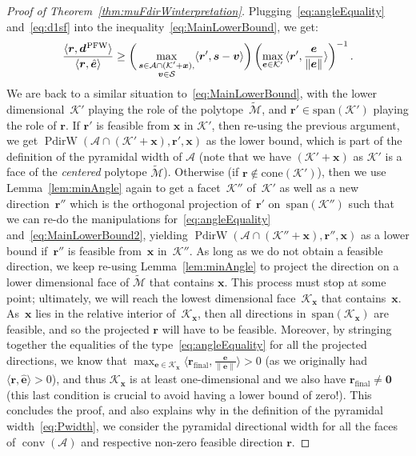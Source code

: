 \documentclass{article} %
\DeclareMathOperator*{\conv}{conv}
\newcommand{\domain}{\mathcal{M}} %
\newcommand{\PFW}{{\hspace{0.05em}\textnormal{PFW}}}
\newcommand{\x}{\bm{x}}
\newcommand{\s}{\bm{s}}
\newcommand{\dd}{\bm{d}}
\newcommand{\vv}{\bm{v}} %
\newcommand{\Vertices}{\mathcal{A}} %
\renewcommand{\S}{\mathcal{S}}
\renewcommand{\r}{\bm{r}}
\newcommand{\PdirW}{\mathop{PdirW}}
\newcommand{\innerProdCompressed}[2]{\langle #1 , #2 \rangle}
\newcommand{\Kface}{\mathcal{K}}
\newcommand{\err}{\bm{e}} %
\newcommand{\0}{\mathbf{0}} %
\begin{document}
\begin{proof}[Proof of Theorem~\ref{thm:muFdirWinterpretation}]
Plugging~\eqref{eq:angleEquality} and~\eqref{eq:d1sf} into the inequality~\eqref{eq:MainLowerBound},
we get:
\begin{equation} \label{eq:MainLowerBound2}
\frac{\innerProdCompressed{\r}{\dd^\PFW}}{\innerProdCompressed{\r}{\hat{\err}}} \geq
	\bigg( \max_{\substack{\s \in \Vertices \cap (\Kface' + \x), \\ \vv \in \S}} \innerProdCompressed{\r'}{\s - \vv} \bigg)
	\left( \max_{\err \in \Kface'} \, \innerProdCompressed{\r'}{\frac{\err}{\|\err\|}} \right)^{-1} .
\end{equation}
We are back to a similar situation to~\eqref{eq:MainLowerBound}, with the lower dimensional~$\Kface'$ playing the role of the polytope~$\tilde{\domain}$, and $\r' \in \text{span}(\Kface')$ playing the role of $\r$.
If $\r'$ is feasible from $\x$ in $\Kface'$, then re-using the previous argument,
we get $\PdirW(\Vertices \cap (\Kface' + \x), \r', \x)$ as the lower bound, which is part
of the definition of the pyramidal width of $\Vertices$ (note that we have $(\Kface'\!+\!\x)$
as $\Kface'$ is a face of the \emph{centered} polytope $\tilde{\domain}$). 
Otherwise (if $\r \not \in \text{cone}(\Kface')$),
then we use Lemma~\ref{lem:minAngle} again to get a facet~$\Kface''$ of~$\Kface'$ as
well as a new direction~$\r''$ which is the orthogonal projection of~$\r'$ on~$\text{span}(\Kface'')$
such that we can re-do the manipulations for~\eqref{eq:angleEquality} and~\eqref{eq:MainLowerBound2},
yielding $\PdirW(\Vertices \cap (\Kface'' + \x), \r'', \x)$ as a lower bound
if~$\r''$ is feasible from~$\x$ in~$\Kface''$. As long as we do not obtain a feasible
direction, we keep re-using Lemma~\ref{lem:minAngle} to project the direction
on a lower dimensional face of
$\tilde{\domain}$ that contains $\x$. This process must stop at some point; ultimately,
we will reach the lowest dimensional face~$\Kface_{\x}$ that contains~$\x$.
As~$\x$ lies in the relative interior of~$\Kface_{\x}$, then all 
directions in~$\text{span}(\Kface_{\x})$ are feasible, and so the projected
$\r$ will have to be feasible.
Moreover, by stringing together the equalities of the type~\eqref{eq:angleEquality}
for all the projected directions, we know that $\max_{\err \in \Kface_{\x}} \innerProdCompressed{\r_{\mathrm{final}}}{\frac{\err}{\|\err\|}} > 0$ (as we originally
had $\innerProdCompressed{\r}{\hat{\err}} > 0$), and thus $\Kface_{\x}$ is 
at least one-dimensional and we also have $\r_{\mathrm{final}} \neq \0$
(this last condition is crucial to avoid having a lower bound of zero!).
This concludes the proof, and also explains why in the definition
of the pyramidal width~\eqref{eq:Pwidth}, we consider
the pyramidal directional width for
all the faces of $\conv(\Vertices)$ and respective non-zero 
feasible direction $\r$.
\end{proof}
\end{document}
